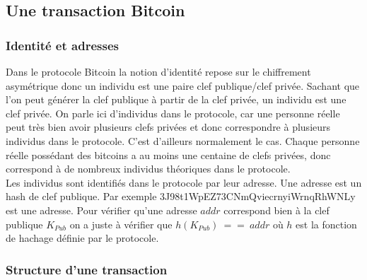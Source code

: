 \documentclass[11pt,a4paper]{article}
\begin{document}
\subsection{Une transaction Bitcoin}

\subsubsection{Identité et adresses}

Dans le protocole Bitcoin la notion d'identité repose sur le chiffrement asymétrique donc un individu est une paire clef publique/clef privée. Sachant que l'on peut générer la clef publique à partir de la clef privée, un individu est une clef privée. On parle ici d'individus dans le protocole, car une personne réelle peut très bien avoir plusieurs clefs privées et donc correspondre à plusieurs individus dans le protocole. C'est d'ailleurs normalement le cas. Chaque personne réelle possédant des bitcoins a au moins une centaine de clefs privées, donc correspond à de nombreux individus théoriques dans le protocole.\\
Les individus sont identifiés dans le protocole par leur adresse. Une adresse est un hash de clef publique. Par exemple 3J98t1WpEZ73CNmQviecrnyiWrnqRhWNLy est une adresse. Pour vérifier qu'une adresse $addr$ correspond bien à la clef publique $K_{Pub}$ on a juste à vérifier que $h(K_{Pub})~ ==~ addr$ où $h$ est la fonction de hachage définie par le protocole.

\subsubsection{Structure d'une transaction}
\end{document}
